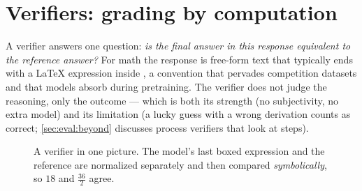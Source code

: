 \section{Verifiers: grading by computation}\label{sec:eval:verifiers}

A verifier answers one question: \emph{is the final answer in this response equivalent to the
reference answer?} For math the response is free-form text that typically ends with a
\LaTeX{} expression inside \bx{}, a convention that pervades competition datasets and that
models absorb during pretraining. The verifier does not judge the reasoning, only the
outcome --- which is both its strength (no subjectivity, no extra model) and its limitation (a
lucky guess with a wrong derivation counts as correct; \cref{sec:eval:beyond} discusses process
verifiers that look at steps).

\begin{figure}[t]
\centering
{}
\caption{A verifier in one picture. The model's last boxed expression and the reference are
normalized separately and then compared \emph{symbolically}, so $18$ and $\frac{36}{2}$ agree.}
\label{fig:eval:verifier}
\end{figure}

